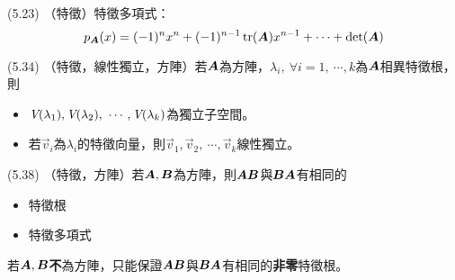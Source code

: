 
\item \begin{theorem}{(5.23)} （特徵）特徵多項式：
	\begin{equation}
		p_{\boldsymbol{A}}(x) = (-1)^nx^n + (-1)^{n - 1}\operatorname{tr}(\boldsymbol{A})x^{n - 1} + \cdots + \det(\boldsymbol{A})
	\end{equation}
\end{theorem}

\item \begin{theorem}{(5.34)} （特徵，線性獨立，方陣）若$\boldsymbol{A}$為方陣，$\lambda_i, \ \forall i = 1, \ \cdots, k$為$\boldsymbol{A}$相異特徵根，則
	\begin{itemize}
		\item $\V(\lambda_1), \V(\lambda_2), \ \cdots, \V(\lambda_k)$為獨立子空間。
		\item 若$\vec{v}_i$為$\lambda_i$的特徵向量，則$\vec{v}_1, \vec{v}_2, \ \cdots, \vec{v}_k$線性獨立。
	\end{itemize}
\end{theorem}

\item \begin{theorem}{(5.38)} （特徵，方陣）若$\boldsymbol{A}, \boldsymbol{B}$為方陣，則$\boldsymbol{AB}$與$\boldsymbol{BA}$有相同的
	\begin{itemize}
		\item 特徵根
		\item 特徵多項式
	\end{itemize}
	若$\boldsymbol{A}, \boldsymbol{B}$\textbf{不}為方陣，只能保證$\boldsymbol{AB}$與$\boldsymbol{BA}$有相同的\textbf{非零}特徵根。
\end{theorem}

